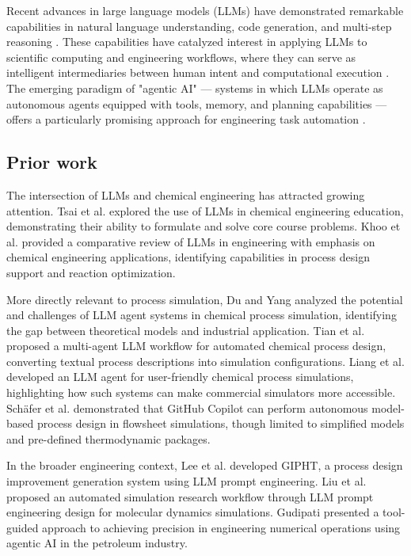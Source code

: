 \documentclass[review,3p]{elsarticle}
\begin{document}
Recent advances in large language models (LLMs) have demonstrated remarkable capabilities in natural language understanding, code generation, and multi-step reasoning \citep{Brown2020, OpenAI2023}. These capabilities have catalyzed interest in applying LLMs to scientific computing and engineering workflows, where they can serve as intelligent intermediaries between human intent and computational execution \citep{Schweidtmann2021, Woo2025}. The emerging paradigm of "agentic AI" --- systems in which LLMs operate as autonomous agents equipped with tools, memory, and planning capabilities --- offers a particularly promising approach for engineering task automation \citep{Ferrag2025, AbouAli2025}.

\subsection{Prior work}

The intersection of LLMs and chemical engineering has attracted growing attention. Tsai et al. \citep{Tsai2023} explored the use of LLMs in chemical engineering education, demonstrating their ability to formulate and solve core course problems. Khoo et al. \citep{Khoo2025} provided a comparative review of LLMs in engineering with emphasis on chemical engineering applications, identifying capabilities in process design support and reaction optimization.

More directly relevant to process simulation, Du and Yang \citep{Du2025} analyzed the potential and challenges of LLM agent systems in chemical process simulation, identifying the gap between theoretical models and industrial application. Tian et al. \citep{Tian2026} proposed a multi-agent LLM workflow for automated chemical process design, converting textual process descriptions into simulation configurations. Liang et al. \citep{Liang2026} developed an LLM agent for user-friendly chemical process simulations, highlighting how such systems can make commercial simulators more accessible. Sch\"{a}fer et al. \citep{Schafer2026} demonstrated that GitHub Copilot can perform autonomous model-based process design in flowsheet simulations, though limited to simplified models and pre-defined thermodynamic packages.

In the broader engineering context, Lee et al. \citep{Lee2024} developed GIPHT, a process design improvement generation system using LLM prompt engineering. Liu et al. \citep{Liu2024} proposed an automated simulation research workflow through LLM prompt engineering design for molecular dynamics simulations. Gudipati \citep{Gudipati2025} presented a tool-guided approach to achieving precision in engineering numerical operations using agentic AI in the petroleum industry.
\end{document}

